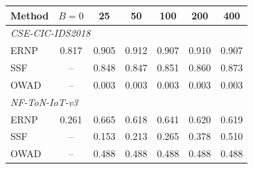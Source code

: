 \begin{tabular}{lcccccc}
\toprule
Method & $B{=}0$ & 25 & 50 & 100 & 200 & 400\\
\midrule
\multicolumn{7}{l}{\emph{CSE-CIC-IDS2018}}\\
ERNP & 0.817 & 0.905 & 0.912 & 0.907 & 0.910 & 0.907\\
SSF & -- & 0.848 & 0.847 & 0.851 & 0.860 & 0.873\\
OWAD & -- & 0.003 & 0.003 & 0.003 & 0.003 & 0.003\\
\midrule
\multicolumn{7}{l}{\emph{NF-ToN-IoT-v3}}\\
ERNP & 0.261 & 0.665 & 0.618 & 0.641 & 0.620 & 0.619\\
SSF & -- & 0.153 & 0.213 & 0.265 & 0.378 & 0.510\\
OWAD & -- & 0.488 & 0.488 & 0.488 & 0.488 & 0.488\\
\bottomrule
\end{tabular}
